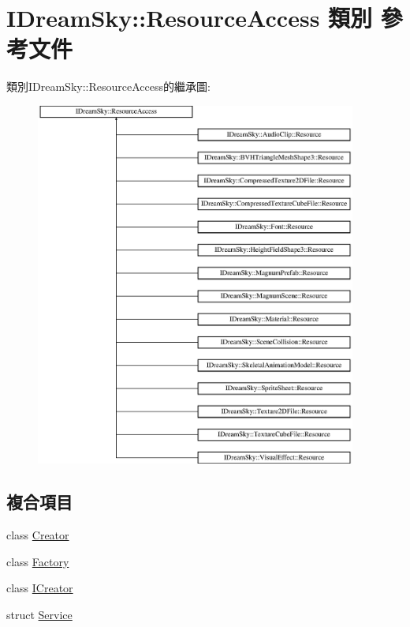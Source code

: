 \hypertarget{class_i_dream_sky_1_1_resource_access}{}\section{I\+Dream\+Sky\+:\+:Resource\+Access 類別 參考文件}
\label{class_i_dream_sky_1_1_resource_access}
類別\+I\+Dream\+Sky\+:\+:Resource\+Access的繼承圖\+:\begin{figure}[H]
\begin{center}
\leavevmode
\includegraphics[height=12.000000cm]{class_i_dream_sky_1_1_resource_access}
\end{center}
\end{figure}
\subsection*{複合項目}
\begin{DoxyCompactItemize}
\item 
class \hyperlink{class_i_dream_sky_1_1_resource_access_1_1_creator}{Creator}
\item 
class \hyperlink{class_i_dream_sky_1_1_resource_access_1_1_factory}{Factory}
\item 
class \hyperlink{class_i_dream_sky_1_1_resource_access_1_1_i_creator}{I\+Creator}
\item 
struct \hyperlink{struct_i_dream_sky_1_1_resource_access_1_1_service}{Service}
\end{DoxyCompactItemize}
